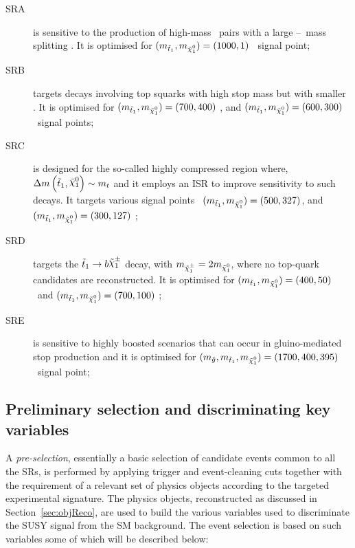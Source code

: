 		\begin{description}
			\item [SRA] is sensitive to the production of high-mass \stop\ pairs with a large \stop--\ninoone\ mass splitting \dmstopnino. It is optimised for $(\mstopone, \mninoone) = (1000,1)$ \GeV\ signal point;
			
			\item [SRB] targets decays involving top squarks with high stop mass but with smaller \dmstopnino. It is optimised for $(\mstopone, \mninoone) = (700, 400)$ \GeV, and $(\mstopone, \mninoone) = (600, 300)$ \GeV\ signal points;
			
			\item [SRC] is designed for the so-called highly compressed region where, $\dmstopnino \sim m_t$ and it employs an \ac{ISR} to improve sensitivity to such decays. It targets various signal points \eg\ $(\mstopone, \mninoone) = (500, 327)$, and $(\mstopone, \mninoone) = (300, 127)$ \GeV; 
			
			\item [SRD] targets the $\stopone \to b \chinoonepm$ decay, with $\mchinoonepm = 2\mninoone$, where no top-quark candidates are reconstructed. It is optimised for $(\mstopone, \mninoone) = (400,50)$ \GeV\ and $(\mstopone, \mninoone) = (700,100)$ \GeV; 
			
			\item [SRE] is sensitive to highly boosted scenarios that can occur in gluino-mediated stop production and it is optimised for $(\mgluino, \mstopone, \mninoone) = (1700, 400, 395)$ \GeV\ signal point;
		\end{description}

		\subsection{Preliminary selection and discriminating key variables}
		\label{sec:vars_used}

			A \emph{pre-selection}, essentially a basic selection of candidate events common to all the \acp{SR}, is performed by applying trigger and event-cleaning cuts together with the requirement of a relevant set of physics objects according to the targeted experimental signature. The physics objects, reconstructed as discussed in Section~\ref{sec:objReco}, are used to build the various variables used to discriminate the \ac{SUSY} signal from the \ac{SM} background. The event selection is based on such variables some of which will be described below:

